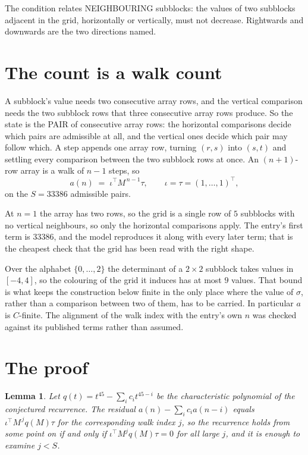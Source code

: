 \documentclass[11pt,a4paper]{article}
\theoremstyle{plain}
\newtheorem{lemma}[theorem]{Lemma}
\theoremstyle{definition}
\begin{document}
The condition relates NEIGHBOURING subblocks: the values of two subblocks adjacent in the grid,
horizontally or vertically, must not decrease. Rightwards and downwards are the two directions named.

\section{The count is a walk count}

A subblock's value needs two consecutive array rows, and the vertical
comparison needs the two subblock rows that three consecutive array rows produce. So the state
is the PAIR of consecutive array rows: the horizontal comparisons decide which pairs are
admissible at all, and the vertical ones decide which pair may follow which. A step appends one
array row, turning $(r,s)$ into $(s,t)$ and settling every comparison between the two subblock
rows at once. An $(n+1)$-row array is a walk of $n-1$ steps, so
\[
a(n)\;=\;\iota^{\!\top}M^{\,n-1}\tau,\qquad\iota=\tau=(1,\dots,1)^{\!\top},
\]
on the $S=33386$ admissible pairs.

At $n=1$ the array has two rows, so the grid is a single row of $5$
subblocks with no vertical neighbours, so only the horizontal comparisons apply. The
entry's first term is $33386$, and the model reproduces it along with every later term; that
is the cheapest check that the grid has been read with the right shape.

Over the alphabet $\{0,\dots,2\}$ the determinant of a $2\times2$ subblock takes values in
$[-4,4]$, so the colouring of the grid it induces has at most $9$ values.
That bound is what keeps the construction below finite in the only place where the value of
$\sigma$, rather than a comparison between two of them, has to be carried.
In particular $a$ is $C$-finite. The alignment of the walk index with the entry's own $n$ was
checked against its published terms rather than assumed.

\section{The proof}

\begin{lemma}\label{lem:crit}
Let $q(t)=t^{45}-\sum_i c_it^{45-i}$ be the characteristic polynomial of the
conjectured recurrence. The residual $a(n)-\sum_ic_ia(n-i)$ equals
$\iota^{\!\top}M^{\,j}q(M)\tau$ for the corresponding walk index $j$, so the recurrence
holds from some point on if and only if $\iota^{\!\top}M^{j}q(M)\tau=0$ for all large $j$,
and it is enough to examine $j<S$.
\end{lemma}
\end{document}

